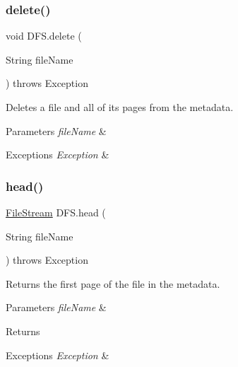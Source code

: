 \subsubsection{\texorpdfstring{delete()}{delete()}}
{\footnotesize\ttfamily void D\+F\+S.\+delete (\begin{DoxyParamCaption}\item[{String}]{file\+Name }\end{DoxyParamCaption}) throws Exception\hspace{0.3cm}{\ttfamily [inline]}}

Deletes a file and all of its pages from the metadata. 
\begin{DoxyParams}{Parameters}
{\em file\+Name} & \\
\hline
\end{DoxyParams}

\begin{DoxyExceptions}{Exceptions}
{\em Exception} & \\
\hline
\end{DoxyExceptions}
\mbox{\label{class_d_f_s_a73915159a4290c3832635b6c4338ff7e}} 
\subsubsection{\texorpdfstring{head()}{head()}}
{\footnotesize\ttfamily \mbox{\hyperlink{class_file_stream}{File\+Stream}} D\+F\+S.\+head (\begin{DoxyParamCaption}\item[{String}]{file\+Name }\end{DoxyParamCaption}) throws Exception\hspace{0.3cm}{\ttfamily [inline]}}

Returns the first page of the file in the metadata. 
\begin{DoxyParams}{Parameters}
{\em file\+Name} & \\
\hline
\end{DoxyParams}
\begin{DoxyReturn}{Returns}

\end{DoxyReturn}

\begin{DoxyExceptions}{Exceptions}
{\em Exception} & \\
\hline
\end{DoxyExceptions}
\mbox{\label{class_d_f_s_a753e09aab8e500f333585f1a6ee865e1}} 
